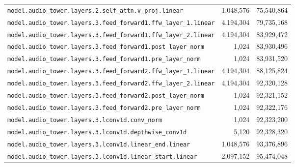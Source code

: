\documentclass[10pt,a4paper]{article}
\theoremstyle{definition}
\begin{document}
\begin{appendices}
\begin{longtable}{p{9.5cm}rr}
\texttt{model.\allowbreak{}audio\_tower.\allowbreak{}layers.\allowbreak{}2.\allowbreak{}self\_attn.\allowbreak{}v\_proj.\allowbreak{}linear} & 1,048,576 & 75,540,864 \\
\texttt{model.\allowbreak{}audio\_tower.\allowbreak{}layers.\allowbreak{}3.\allowbreak{}feed\_forward1.\allowbreak{}ffw\_layer\_1.\allowbreak{}linear} & 4,194,304 & 79,735,168 \\
\texttt{model.\allowbreak{}audio\_tower.\allowbreak{}layers.\allowbreak{}3.\allowbreak{}feed\_forward1.\allowbreak{}ffw\_layer\_2.\allowbreak{}linear} & 4,194,304 & 83,929,472 \\
\texttt{model.\allowbreak{}audio\_tower.\allowbreak{}layers.\allowbreak{}3.\allowbreak{}feed\_forward1.\allowbreak{}post\_layer\_norm} & 1,024 & 83,930,496 \\
\texttt{model.\allowbreak{}audio\_tower.\allowbreak{}layers.\allowbreak{}3.\allowbreak{}feed\_forward1.\allowbreak{}pre\_layer\_norm} & 1,024 & 83,931,520 \\
\texttt{model.\allowbreak{}audio\_tower.\allowbreak{}layers.\allowbreak{}3.\allowbreak{}feed\_forward2.\allowbreak{}ffw\_layer\_1.\allowbreak{}linear} & 4,194,304 & 88,125,824 \\
\texttt{model.\allowbreak{}audio\_tower.\allowbreak{}layers.\allowbreak{}3.\allowbreak{}feed\_forward2.\allowbreak{}ffw\_layer\_2.\allowbreak{}linear} & 4,194,304 & 92,320,128 \\
\texttt{model.\allowbreak{}audio\_tower.\allowbreak{}layers.\allowbreak{}3.\allowbreak{}feed\_forward2.\allowbreak{}post\_layer\_norm} & 1,024 & 92,321,152 \\
\texttt{model.\allowbreak{}audio\_tower.\allowbreak{}layers.\allowbreak{}3.\allowbreak{}feed\_forward2.\allowbreak{}pre\_layer\_norm} & 1,024 & 92,322,176 \\
\texttt{model.\allowbreak{}audio\_tower.\allowbreak{}layers.\allowbreak{}3.\allowbreak{}lconv1d.\allowbreak{}conv\_norm} & 1,024 & 92,323,200 \\
\texttt{model.\allowbreak{}audio\_tower.\allowbreak{}layers.\allowbreak{}3.\allowbreak{}lconv1d.\allowbreak{}depthwise\_conv1d} & 5,120 & 92,328,320 \\
\texttt{model.\allowbreak{}audio\_tower.\allowbreak{}layers.\allowbreak{}3.\allowbreak{}lconv1d.\allowbreak{}linear\_end.\allowbreak{}linear} & 1,048,576 & 93,376,896 \\
\texttt{model.\allowbreak{}audio\_tower.\allowbreak{}layers.\allowbreak{}3.\allowbreak{}lconv1d.\allowbreak{}linear\_start.\allowbreak{}linear} & 2,097,152 & 95,474,048 \\

\end{longtable}
\end{appendices}
\end{document}
